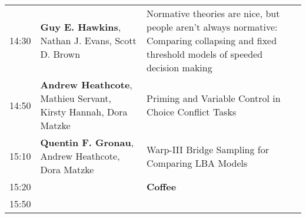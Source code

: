\documentclass[]{article}
\begin{document}
\begin{longtable}[]{@{}lll@{}}
\begin{minipage}[t]{0.03\columnwidth}\raggedright\strut
14:30\strut
\end{minipage} & \begin{minipage}[t]{0.32\columnwidth}\raggedright\strut
\textbf{Guy E. Hawkins}, Nathan J. Evans, Scott D. Brown\strut
\end{minipage} & \begin{minipage}[t]{0.57\columnwidth}\raggedright\strut
Normative theories are nice, but people aren't always normative:
Comparing collapsing and fixed threshold models of speeded decision
making\strut
\end{minipage}\tabularnewline
\begin{minipage}[t]{0.03\columnwidth}\raggedright\strut
14:50\strut
\end{minipage} & \begin{minipage}[t]{0.32\columnwidth}\raggedright\strut
\textbf{Andrew Heathcote}, Mathieu Servant, Kirsty Hannah, Dora
Matzke\strut
\end{minipage} & \begin{minipage}[t]{0.57\columnwidth}\raggedright\strut
Priming and Variable Control in Choice Conflict Tasks\strut
\end{minipage}\tabularnewline
\begin{minipage}[t]{0.03\columnwidth}\raggedright\strut
15:10\strut
\end{minipage} & \begin{minipage}[t]{0.32\columnwidth}\raggedright\strut
\textbf{Quentin F. Gronau}, Andrew Heathcote, Dora Matzke\strut
\end{minipage} & \begin{minipage}[t]{0.57\columnwidth}\raggedright\strut
Warp-III Bridge Sampling for Comparing LBA Models\strut
\end{minipage}\tabularnewline
\begin{minipage}[t]{0.03\columnwidth}\raggedright\strut
15:20\strut
\end{minipage} & \begin{minipage}[t]{0.32\columnwidth}\raggedright\strut
\strut
\end{minipage} & \begin{minipage}[t]{0.57\columnwidth}\raggedright\strut
\textbf{Coffee}\strut
\end{minipage}\tabularnewline
\begin{minipage}[t]{0.03\columnwidth}\raggedright\strut
15:50\strut
\end{minipage} & \begin{minipage}[t]{0.32\columnwidth}\raggedright\strut

\end{minipage}
\end{longtable}
\end{document}
